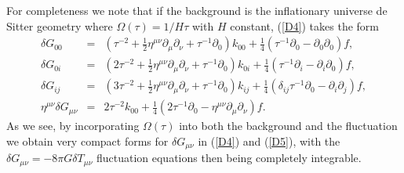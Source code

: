 \documentclass[aps]{revtex4}
\begin{document}
For completeness we note that if the background is the inflationary universe de Sitter geometry where $\Omega(\tau)=1/H\tau$ with $H$ constant, (\ref{D4}) takes the form
%
\begin{eqnarray}
\delta G_{00}&=&
(\tau^{-2} + \tfrac{1}{2} \eta^{\mu \nu} \partial_{\mu} \partial_{\nu} + \tau^{-1} \partial_{0}) k_{00} + \tfrac{1}{4} (\tau^{-1} \partial_{0} -   \partial_{0} \partial_{0}) f,
\nonumber\\
\delta G_{0i}&=&
(2 \tau^{-2} + \tfrac{1}{2} \eta^{\mu \nu} \partial_{\mu} \partial_{\nu} + \tau^{-1} \partial_{0}) k_{0i} + \tfrac{1}{4} ( \tau^{-1} \partial_{i} -  \partial_{i} \partial_{0}) f,
\nonumber\\
\delta G_{ij}&=&
(3 \tau^{-2} + \tfrac{1}{2} \eta^{\mu \nu} \partial_{\mu} \partial_{\nu} + \tau^{-1} \partial_{0}) k_{ij} + \tfrac{1}{4} (\delta_{ij} \tau^{-1} \partial_{0} -   \partial_{i} \partial_{j}) f,
\nonumber\\
\eta^{\mu\nu}\delta G_{\mu\nu}&=&2\tau^{-2}k_{00}+ \tfrac{1}{4}  (2\tau^{-1}\partial_{0} -\eta^{\mu\nu}\partial_{\mu}\partial_{\nu}) f.
\label{D5}
\end{eqnarray}
%
As we see, by incorporating $\Omega(\tau)$ into both the background and the fluctuation we obtain very compact forms for $\delta G_{\mu\nu}$  in (\ref{D4}) and (\ref{D5}), with the $\delta G_{\mu\nu}=-8\pi G \delta T_{\mu\nu}$ fluctuation equations then being completely integrable.
\end{document}
